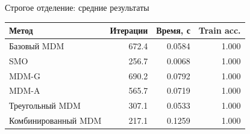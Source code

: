 \SPBGContentSlide
  {Строгое отделение: средние результаты}
  {%
    \centering
    \Body
    \renewcommand{\arraystretch}{1.18}
    \setlength{\tabcolsep}{10pt}
    \begin{tabular}{|l|r|r|r|}
      \hline
      Метод & Итерации & Время, с & Train acc. \\
      \hline
      Базовый MDM & 672.4 & 0.0584 & 1.000 \\
      \hline
      SMO & 256.7 & 0.0068 & 1.000 \\
      \hline
      MDM-G & 690.2 & 0.0792 & 1.000 \\
      \hline
      MDM-A & 565.7 & 0.0719 & 1.000 \\
      \hline
      Треугольный MDM & 307.1 & 0.0533 & 1.000 \\
      \hline
      Комбинированный MDM & 217.1 & 0.1259 & 1.000 \\
      \hline
    \end{tabular}
  }
